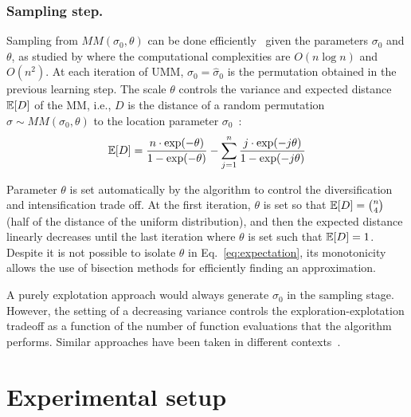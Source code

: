 \documentclass[runningheads]{llncs}
\begin{document}
\subsubsection{Sampling step.}\label{sec:sampling}
Sampling from $MM(\sigma_0,\theta)$  can be done efficiently~\cite{IruCalLoz2016permallows} given the parameters  $\sigma_0$ and $\theta$, as studied by \citet{Collas,IruCalLoz2016permallows,DoiPekReg2004rank} where the computational complexities are $O(n\log n)$ and $O(n^2)$.
%
At each iteration of UMM, $\sigma_0=\hat\sigma_0$ is the permutation obtained in the previous learning step. The scale $\theta$ controls the variance and expected distance $\mathbb{E}[D]$ of the MM, i.e., $D$ is the distance of a random permutation $\sigma\sim MM(\sigma_0, \theta)$ to the location parameter $\sigma_0$~\cite{gMallows}:
%
\begin{equation}\label{eq:expectation}
\mathbb{E}[D] = \frac{n \cdot \exp(-\theta)}{1-\exp(-\theta)} - \sum_{j=1}^{n}  \frac{j\cdot\exp(-j  \theta)}{1-\exp(-j\theta)}
\end{equation}

Parameter $\theta$ is set automatically by the algorithm to control the diversification and intensification trade off. At the first iteration, $\theta$ is set so that  $\mathbb{E}[D] = \binom{n}{4}$ (half of the distance of the uniform distribution), and then the expected distance linearly decreases until the last iteration where $\theta$ is set such that $\mathbb{E}[D] = 1$. Despite it is not possible to isolate $\theta$ in Eq.~\eqref{eq:expectation}, its monotonicity allows the use of bisection methods for efficiently finding an approximation. 

A purely explotation approach would always generate $\sigma_0$ in the sampling stage. However, the setting of a decreasing variance   controls the exploration-explotation tradeoff as a function of the number of function evaluations that the algorithm performs.  Similar approaches have been taken in different contexts~\cite{ArzCebPer2019qap}.





\section{Experimental setup}
\end{document}
